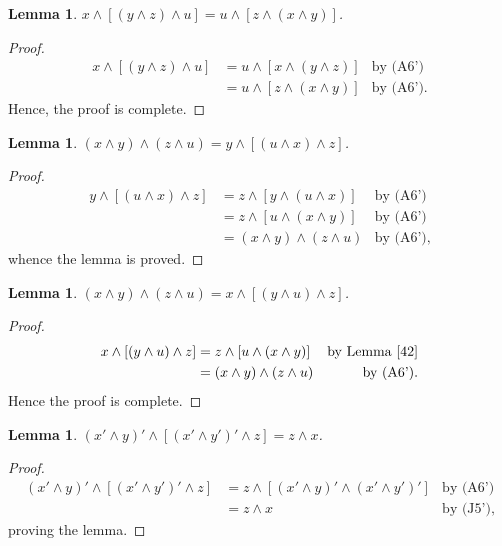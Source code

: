 \documentclass{amsart}
\theoremstyle{plain}
\newtheorem{lemma}[theorem]{Lemma}
\theoremstyle{problem}
\theoremstyle{definition}
\theoremstyle{remark}
\numberwithin{equation}{section}
\begin{document}
\begin{lemma}\label{46}
    $x \land [(y \land z) \land u] = u \land [z \land (x \land y)]$.
\end{lemma}

\begin{proof}
\begin{align*}
    x \land [(y \land z) \land u]
                 &= u \land [x \land (y \land z)] &\text{by (A6')}\\
                 &= u \land [z \land (x \land y)] &\text{by (A6')}.
\end{align*}
Hence, the proof is complete.
\end{proof}

\begin{lemma}\label{47}
    $(x \land y) \land (z \land u) = y \land [(u \land x) \land z]$.
\end{lemma}
\begin{proof}
\begin{align*}
   y \land [(u \land x) \land z]
             &= z \land [y \land (u \land x)] &\text{by (A6')}\\
             &=z \land [u \land (x \land y)] &\text{by (A6')}\\
             &= (x \land y) \land (z \land u) &\text{by (A6')},
\end{align*}
whence the lemma is proved. 
\end{proof}

\begin{lemma}\label{48}
    $(x \land y) \land (z \land u) = x \land [(y \land u) \land z]$.
\end{lemma}

\begin{proof}
\begin{align*}
    x \land [(y \land u) \land z] &= z \land [u \land (x \land y)] &\text{by Lemma \ref{42}} \\ 
                                  &= (x \land y) \land (z \land u) &\text{by (A6')}.
\end{align*}
Hence the proof is complete.
\end{proof}

\begin{lemma}\label{49}
    $(x' \land y)' \land [(x' \land y')' \land z] = z \land x$.
\end{lemma}

\begin{proof}
\begin{align*}
    (x' \land y)' \land [(x' \land y')' \land z]
             &= z \land [(x' \land y)' \land (x' \land y')'] &\text{by (A6')}\\
             &= z \land x &\text{by (J5')},
\end{align*}
proving the lemma.
\end{proof}
\end{document}
